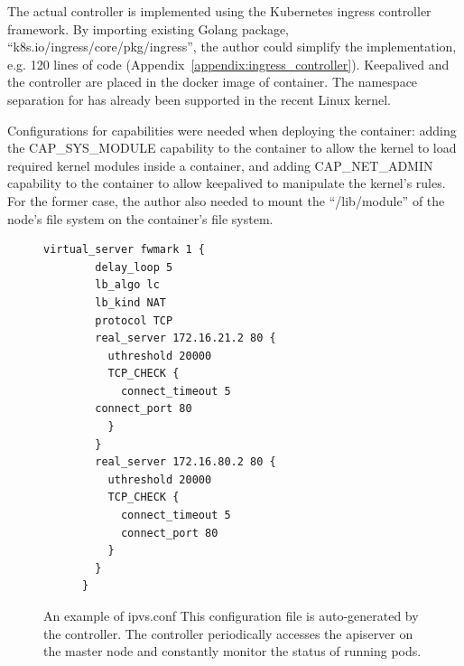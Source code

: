 The actual controller \cite{ktaka_ccmp_2017_826894} is implemented using the Kubernetes ingress controller \cite{K8sIngress2017} framework. 
By importing existing Golang package, \enquote{k8s.io/ingress/core/pkg/ingress}, the author could simplify the implementation, e.g. 
120 lines of code (Appendix~\ref{appendix:ingress_controller}).
%
Keepalived and the controller are placed in the docker image of  container.
The namespace separation for  has already been supported in the recent Linux kernel. 

Configurations for capabilities were needed when deploying the  container: adding the CAP\_SYS\_MODULE capability 
to the container to allow the kernel to load required kernel modules inside a container, 
and adding CAP\_NET\_ADMIN capability to the container to allow keepalived to manipulate the kernel's  rules. 
For the former case, the author also needed to mount the \enquote{/lib/module} of the node's file system on the container's file system.

\begin{figure}[h]
  \centering
  \begin{minipage}{0.7\columnwidth}
    \begin{lstlisting}[frame=single]
      virtual_server fwmark 1 {
        delay_loop 5
        lb_algo lc
        lb_kind NAT
        protocol TCP
        real_server 172.16.21.2 80 {
          uthreshold 20000
          TCP_CHECK {
            connect_timeout 5
        connect_port 80
          }
        }
        real_server 172.16.80.2 80 {
          uthreshold 20000
          TCP_CHECK {
            connect_timeout 5
            connect_port 80
          }
        }
      }
    \end{lstlisting}
  \end{minipage}

  \par\bigskip
    \centering
    \begin{minipage}{0.9\columnwidth}
      \caption[An example of ipvs.conf]{
        An example of ipvs.conf
        This configuration file is auto-generated by the controller.
        The controller periodically accesses the apiserver on the master node and constantly monitor the status of running pods.
      }
      \label{fig:ipvs.conf}
    \end{minipage}
\end{figure}

